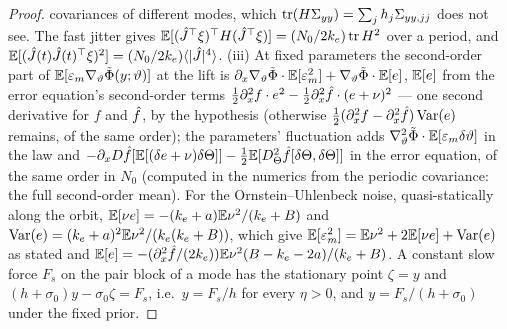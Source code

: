 \begin{proof}
covariances of different modes, which $\operatorname{tr}(H\Sigma_{yy}) = \sum_jh_j\Sigma_{yy,jj}$ does not see. The fast jitter
gives $\mathbb{E}[(\hat J^\top\xi)^\top H(\hat J^\top\xi)] = (N_0/2k_e)\operatorname{tr} H^2$ over a period, and
$\mathbb{E}[(\hat J(t)\hat J(t)^\top\xi)^2] = (N_0/2k_e)\langle\lvert \hat J\rvert^4\rangle$. (iii) At fixed parameters the
second-order part of $\mathbb{E}[\varepsilon_m\nabla_\vartheta\tilde\Phi(y;\vartheta)]$ at the lift is
$\partial_x\nabla_\vartheta\tilde\Phi\cdot\mathbb{E}[\varepsilon_m^2] + \nabla_\vartheta\tilde\Phi\cdot\mathbb{E}[e]$, $\mathbb{E}[e]$ from the
error equation's second-order terms $\frac12\partial^2_xf\cdot e^2 - \frac12\partial^2_x\hat f\cdot(e + \nu)^2$ --- one
second derivative for $f$ and $\hat f$, by the hypothesis (otherwise
$\frac12(\partial^2_xf - \partial^2_x\hat f)\operatorname{Var}(e)$ remains, of the same order); the parameters'
fluctuation adds $\nabla^2_\vartheta\tilde\Phi\cdot\mathbb{E}[\varepsilon_m\delta\vartheta]$ in the law and
$-\partial_xD\hat f[\mathbb{E}[(\delta e + \nu)\delta\Theta]] - \frac12\mathbb{E}[D^2_\Theta\hat f[\delta\Theta,\delta\Theta]]$ in the
error equation, of the same order in $N_0$ (computed in the numerics from the periodic covariance: the full
second-order mean). For the Ornstein--Uhlenbeck noise, quasi-statically along the orbit,
$\mathbb{E}[\nu e] = -(k_e + a)\mathbb{E}\nu^2/(k_e + B)$ and $\operatorname{Var}(e) = (k_e + a)^2\mathbb{E}\nu^2/(k_e(k_e + B))$, which give
$\mathbb{E}[\varepsilon_m^2] = \mathbb{E}\nu^2 + 2\mathbb{E}[\nu e] + \operatorname{Var}(e)$ as stated and
$\mathbb{E}[e] = -(\partial^2_x\hat f/(2k_e))\mathbb{E}\nu^2(B - k_e - 2a)/(k_e + B)$. A constant slow force $F_s$ on the pair block of
a mode has the stationary point $\zeta = y$ and $(h + \sigma_0)y - \sigma_0\zeta = F_s$, i.e.\ $y = F_s/h$ for every
$\eta > 0$, and $y = F_s/(h + \sigma_0)$ under the fixed prior.
\end{proof}
